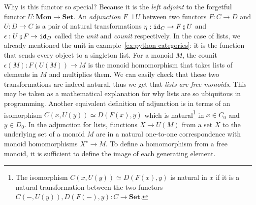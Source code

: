 Why is this functor so special? Because it is the \emph{left adjoint} to the forgetful functor $U : \mathbf{Mon} \to \mathbf{Set}$.
An \emph{adjunction} $F \dashv U$ between two functors $F : C \to D$ and $U : D \to C$ is a pair of natural transformations $\eta : \id_C \to F \fcmp U$ and $\epsilon : U \fcmp F \to \id_D$ called the \emph{unit} and \emph{counit} respectively.
In the case of lists, we already mentioned the unit in example~\ref{ex:python categories}: it is the function that sends every object to a singleton list.
For a monoid $M$, the counit $\epsilon(M) : F(U(M)) \to M$ is the monoid homomorphism that takes lists of elements in $M$ and multiplies them.
We can easily check that these two transformations are indeed natural, thus we get that \emph{lists are free monoids}.
This may be taken as a mathematical explanation for why lists are so ubiquitous in programming.
Another equivalent definition of adjunction is in terms of an isomorphism $C(x, U(y)) \simeq D(F(x), y)$ which is natural\footnote
{The isomorphism $C(x, U(y)) \simeq D(F(x), y)$ is natural in $x$ if it is a natural transformation between the two functors $C(-, U(y)), D(F(-), y) : C \to \mathbf{Set}$.}
in $x \in C_0$ and $y \in D_0$.
In the adjunction for lists, functions $X \to U(M)$ from a set $X$ to the underlying set of a monoid $M$ are in a natural one-to-one correspondence with monoid homomorphisms $X^\star \to M$.
To define a homomorphism from a free monoid, it is sufficient to define the image of each generating element.

